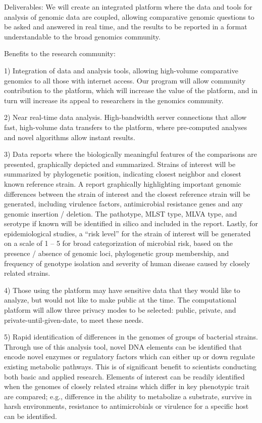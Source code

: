 \documentclass[letterpaper,12pt]{report}
\begin{document}
Deliverables: We will create an integrated platform where the data and tools for analysis of genomic data are coupled, allowing comparative genomic questions to be asked and answered in real time, and the results to be reported in a format understandable to the broad genomics community.

Benefits to the research community:

1) Integration of data and analysis tools, allowing high-volume comparative genomics to all those with internet access. Our program will allow community contribution to the platform, which will increase the value of the platform, and in turn will increase its appeal to researchers in the genomics community.

2) Near real-time data analysis. High-bandwidth server connections that allow fast, high-volume data transfers to the platform, where pre-computed analyses and novel algorithms allow instant results.

3) Data reports where the biologically meaningful features of the comparisons are presented, graphically depicted and summarized. Strains of interest will be summarized by phylogenetic position, indicating closest neighbor and closest known reference strain. A report graphically highlighting important genomic differences between the strain of interest and the closest reference strain will be generated, including virulence factors, antimicrobial resistance genes and any genomic insertion / deletion. The pathotype, MLST type, MLVA type, and serotype if known will be identified in silico and included in the report. Lastly, for epidemiological studies, a “risk level” for the strain of interest will be generated on a scale of 1 – 5 for broad categorization of microbial risk, based on the presence / absence of genomic loci, phylogenetic group membership, and frequency of genotype isolation and severity of human disease caused by closely related strains.

4) Those using the platform may have sensitive data that they would like to analyze, but would not like to make public at the time. The computational platform will allow three privacy modes to be selected: public, private, and private-until-given-date, to meet these needs.

5) Rapid identification of differences in the genomes of groups of bacterial strains. Through use of this analysis tool, novel DNA elements can be identified that encode novel enzymes or regulatory factors which can either up or down regulate existing metabolic pathways. This is of significant benefit to scientists conducting both basic and applied research. Elements of interest can be readily identified when the genomes of closely related strains which differ in key phenotypic trait are compared; e.g., difference in the ability to metabolize a substrate, survive in harsh environments, resistance to antimicrobials or virulence for a specific host can be identified.
\end{document}
